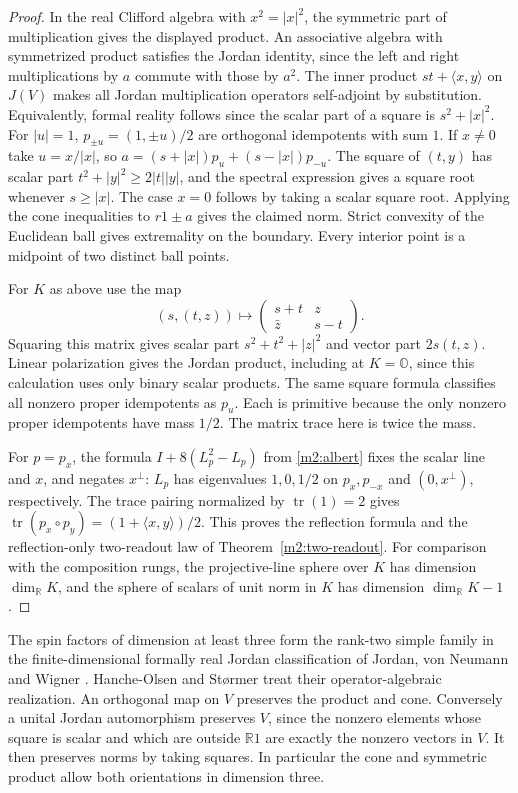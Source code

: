 \documentclass[11pt,reqno]{amsart}
\theoremstyle{definition}
\theoremstyle{remark}
\numberwithin{equation}{section}
\newcommand{\R}{\mathbb{R}}
\newcommand{\ip}[2]{\langle #1,#2\rangle}
\begin{document}
\begin{proof}
In the real Clifford algebra with \(x^2=|x|^2\), the symmetric
part of multiplication gives the displayed product. An associative
algebra with symmetrized product satisfies the Jordan identity, since
the left and right multiplications by \(a\) commute with those by
\(a^2\). The inner product \(st+\ip{x}{y}\) on \(J(V)\) makes all
Jordan multiplication operators self-adjoint by substitution.
Equivalently, formal reality follows since the scalar part of a
square is \(s^2+|x|^2\).
For \(|u|=1\), \(p_{\pm u}=(1,\pm u)/2\) are orthogonal idempotents
with sum \(1\). If \(x\ne0\) take \(u=x/|x|\), so
\(a=(s+|x|)p_u+(s-|x|)p_{-u}\). The square of \((t,y)\) has scalar
part \(t^2+|y|^2\ge 2|t||y|\), and the spectral expression gives a
square root whenever \(s\ge|x|\). The case \(x=0\) follows by taking
a scalar square root. Applying the cone inequalities to \(r1\pm a\)
gives the claimed norm. Strict convexity of the Euclidean ball
gives extremality on the boundary. Every interior point is a
midpoint of two distinct ball points.

For \(K\) as above use the map
\[
 (s,(t,z))\longmapsto
 \begin{pmatrix}s+t&z\\ \bar z&s-t\end{pmatrix}.
\]
Squaring this matrix gives scalar part \(s^2+t^2+|z|^2\) and
vector part \(2s(t,z)\). Linear polarization gives the Jordan
product, including at \(K=\mathbb O\), since this calculation
uses only binary scalar products. The same square formula
classifies all nonzero proper idempotents as \(p_u\). Each is
primitive because the only nonzero proper idempotents have
mass \(1/2\). The matrix trace here is twice the mass.

For \(p=p_x\), the formula \(I+8(L_p^2-L_p)\) from
\eqref{m2:albert} fixes the scalar line and \(x\), and negates
\(x^\perp\): \(L_p\) has eigenvalues \(1,0,1/2\) on \(p_x,p_{-x}\)
and \((0,x^\perp)\), respectively. The trace pairing normalized
by \(\operatorname{tr}(1)=2\) gives
\(\operatorname{tr}(p_x\circ p_y)=(1+\ip{x}{y})/2\).
This proves the reflection formula and the reflection-only
two-readout law of Theorem~\ref{m2:two-readout}. For comparison
with the composition rungs, the projective-line sphere over
\(K\) has dimension \(\dim_{\R}K\), and the sphere of scalars of
unit norm in \(K\) has dimension \(\dim_{\R}K-1\).
\end{proof}

The spin factors of dimension at least three form the rank-two
simple family in the finite-dimensional formally real Jordan
classification of Jordan, von Neumann and Wigner \cite{m2:JNW}.
Hanche-Olsen and St{\o}rmer \cite{m10:HOS} treat their
operator-algebraic realization. An
orthogonal map on \(V\) preserves the product and cone. Conversely
a unital Jordan automorphism preserves \(V\), since the nonzero
elements whose square is scalar and which are outside \(\R 1\)
are exactly the nonzero vectors in \(V\). It then preserves norms
by taking squares. In particular the cone and symmetric product
allow both orientations in dimension three.
\end{document}
